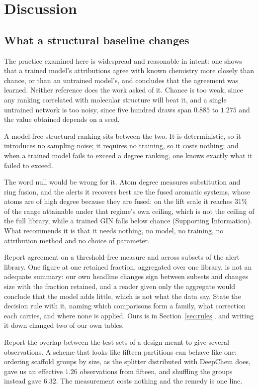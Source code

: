 \documentclass[journal=jcisd8,manuscript=article]{achemso}
\begin{document}
\section{Discussion}

\subsection{What a structural baseline changes}

The practice examined here is widespread and reasonable in intent: one shows that a trained
model's attributions agree with known chemistry more closely than chance, or than an untrained
model's, and concludes that the agreement was learned. Neither reference does the work asked
of it. Chance is too weak, since any ranking correlated with molecular structure will beat it,
and a single untrained network is too noisy, since five hundred draws span $0.885$ to $1.275$
and the value obtained depends on a seed.

A model-free structural ranking sits between the two. It is deterministic, so it introduces no
sampling noise; it requires no training, so it costs nothing; and when a trained model fails
to exceed a degree ranking, one knows exactly what it failed to exceed.

The word null would be wrong for it. Atom degree measures substitution and ring fusion, and
the alerts it recovers best are the fused aromatic systems, whose atoms are of high degree
because they are fused: on the lift scale it reaches 31\% of the range attainable under that
regime's own ceiling, which is not the ceiling of the full library, while a trained GIN falls
below chance (Supporting Information). What recommends it is that it needs nothing, no model,
no training, no attribution method and no choice of parameter.

Report agreement on a threshold-free measure and across subsets of the alert library. One
figure at one retained fraction, aggregated over one library, is not an adequate summary: our
own headline changes sign between subsets and changes size with the fraction retained, and a
reader given only the aggregate would conclude that the model adds little, which is not what
the data say. State the decision rule with it, naming which comparisons form a family, what
correction each carries, and where none is applied. Ours is in Section~\ref{sec:rules}, and
writing it down changed two of our own tables.

Report the overlap between the test sets of a design meant to give several observations. A
scheme that looks like fifteen partitions can behave like one: ordering scaffold groups by
size, as the splitter distributed with DeepChem does, gave us an effective $1.26$ observations
from fifteen, and shuffling the groups instead gave $6.32$. The measurement costs nothing and
the remedy is one line.
\end{document}
